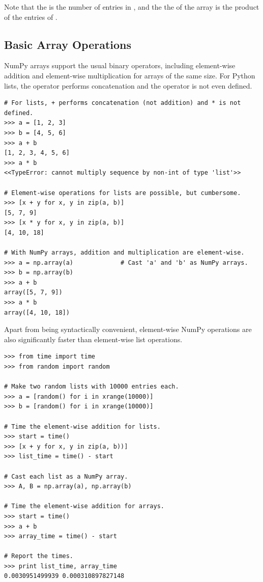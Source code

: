 Note that the  is the number of entries in , and the
the  of the array is the product of the entries of .

\subsection*{Basic Array Operations} %

NumPy arrays support the usual binary operators, including element-wise addition \li{+} and element-wise multiplication \li{*} for arrays of the same size.
For Python lists, the \li{+} operator performs concatenation and the \li{*} operator is not even defined.

\begin{lstlisting}
# For lists, + performs concatenation (not addition) and * is not defined.
>>> a = [1, 2, 3]
>>> b = [4, 5, 6]
>>> a + b
[1, 2, 3, 4, 5, 6]
>>> a * b
<<TypeError: cannot multiply sequence by non-int of type 'list'>>

# Element-wise operations for lists are possible, but cumbersome.
>>> [x + y for x, y in zip(a, b)]
[5, 7, 9]
>>> [x * y for x, y in zip(a, b)]
[4, 10, 18]

# With NumPy arrays, addition and multiplication are element-wise.
>>> a = np.array(a)             # Cast 'a' and 'b' as NumPy arrays.
>>> b = np.array(b)
>>> a + b
array([5, 7, 9])
>>> a * b
array([4, 10, 18])
\end{lstlisting}

Apart from being syntactically convenient, element-wise NumPy operations are also significantly faster than element-wise list operations.

\begin{lstlisting}
>>> from time import time
>>> from random import random

# Make two random lists with 10000 entries each.
>>> a = [random() for i in xrange(10000)]
>>> b = [random() for i in xrange(10000)]

# Time the element-wise addition for lists.
>>> start = time()
>>> [x + y for x, y in zip(a, b))]
>>> list_time = time() - start

# Cast each list as a NumPy array.
>>> A, B = np.array(a), np.array(b)

# Time the element-wise addition for arrays.
>>> start = time()
>>> a + b
>>> array_time = time() - start

# Report the times.
>>> print list_time, array_time
0.0030951499939 0.000310897827148
\end{lstlisting}

